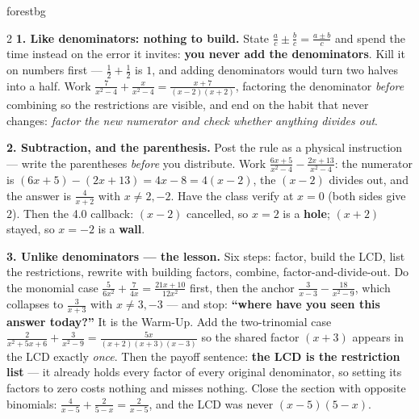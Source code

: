 \documentclass[10pt]{article}
\begin{document}
\begin{skillbox}[Lesson]{forestbg}
\begin{multicols}{2}
\textbf{1. Like denominators: nothing to build.} State $\frac ac\pm\frac bc=\frac{a\pm b}{c}$ and spend
the time instead on the error it invites: \textbf{you never add the denominators}. Kill it on numbers
first --- $\frac12+\frac12$ is $1$, and adding denominators would turn two halves into a half. Work
$\frac{7}{x^2-4}+\frac{x}{x^2-4}=\frac{x+7}{(x-2)(x+2)}$, factoring the denominator \emph{before}
combining so the restrictions are visible, and end on the habit that never changes: \emph{factor the new
numerator and check whether anything divides out}.

\textbf{2. Subtraction, and the parenthesis.} Post the rule as a physical instruction --- write the
parentheses \emph{before} you distribute. Work
$\frac{6x+5}{x^2-4}-\frac{2x+13}{x^2-4}$: the numerator is $(6x+5)-(2x+13)=4x-8=4(x-2)$, the $(x-2)$
divides out, and the answer is $\frac{4}{x+2}$ with $x\neq2,-2$. Have the class verify at $x=0$ (both
sides give $2$). Then the 4.0 callback: $(x-2)$ cancelled, so $x=2$ is a \textbf{hole}; $(x+2)$ stayed,
so $x=-2$ is a \textbf{wall}.

\textbf{3. Unlike denominators --- the lesson.} Six steps: factor, build the LCD, list the restrictions,
rewrite with building factors, combine, factor-and-divide-out. Do the monomial case
$\frac{5}{6x^2}+\frac{7}{4x}=\frac{21x+10}{12x^2}$ first, then the anchor
$\frac{3}{x-3}-\frac{18}{x^2-9}$, which collapses to $\frac{3}{x+3}$ with $x\neq3,-3$ --- and stop:
\textbf{``where have you seen this answer today?''} It is the Warm-Up. Add the two-trinomial case
$\frac{2}{x^2+5x+6}+\frac{3}{x^2-9}=\frac{5x}{(x+2)(x+3)(x-3)}$ so the shared factor $(x+3)$ appears in
the LCD exactly \emph{once}. Then the payoff sentence: \textbf{the LCD is the restriction list} --- it
already holds every factor of every original denominator, so setting its factors to zero costs nothing
and misses nothing. Close the section with opposite binomials:
$\frac{4}{x-5}+\frac{2}{5-x}=\frac{2}{x-5}$, and the LCD was never $(x-5)(5-x)$.

\columnbreak


\end{multicols}
\end{skillbox}
\end{document}
